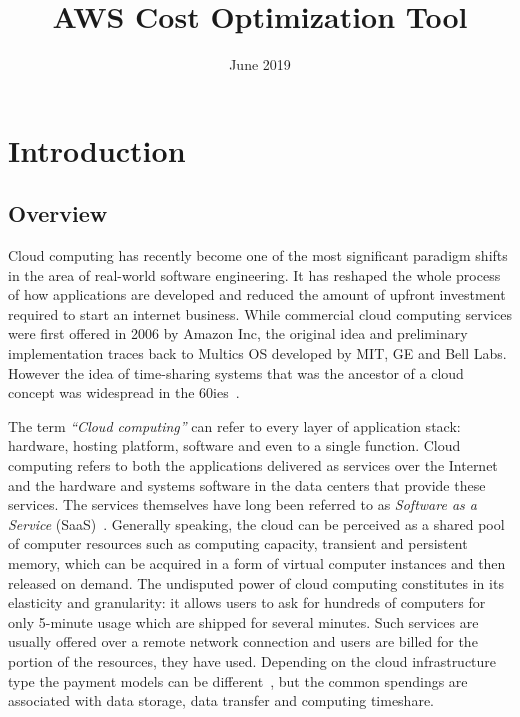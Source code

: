 \documentclass[licencjacka,en]{thesisclass}
\title{AWS Cost Optimization Tool}
\date{June 2019}
\begin{document}
    \maketitle

    \begin{abstract}
        
    \end{abstract}

    \tableofcontents

    \chapter{Introduction}


    \section{Overview}

    Cloud computing has recently become one of the most significant paradigm shifts
    in the area of real-world software engineering.
    It has reshaped the whole process of how applications are developed
    and reduced the amount of upfront
    investment required to start an internet business.
    While commercial cloud computing services were first offered
    in 2006 by Amazon Inc, the original idea and preliminary
    implementation traces back to Multics OS developed by MIT,
    GE and Bell Labs.
    However the idea of time-sharing systems that was the ancestor of a cloud
    concept was widespread in the 60ies~\cite{Markus}.

    The term \textit{“Cloud computing”} can refer to every layer of application stack:
    hardware, hosting platform, software and even to a single function.
    Cloud computing refers to both the applications delivered as services over the Internet
    and the hardware and systems software in the data centers that provide these services.
    The services themselves have long been referred to
    as \textit{Software as a Service} (SaaS)~\cite{Armbrust}.
    Generally speaking, the cloud can be perceived as a shared pool
    of computer resources such as computing capacity,
    transient and persistent memory, which can be acquired in a form
    of virtual computer instances and then released on demand.
    The undisputed power of cloud computing constitutes
    in its elasticity and granularity: it allows users
    to ask for hundreds of computers for only 5-minute usage which
    are shipped for several minutes.
    Such services are usually offered over a remote network connection and users are billed
    for the portion of the resources, they have used.
    Depending on the cloud infrastructure type the payment models
    can be different~\cite{Laatikainen},
    but the common spendings are associated with data storage,
    data transfer and computing timeshare.
\end{document}
